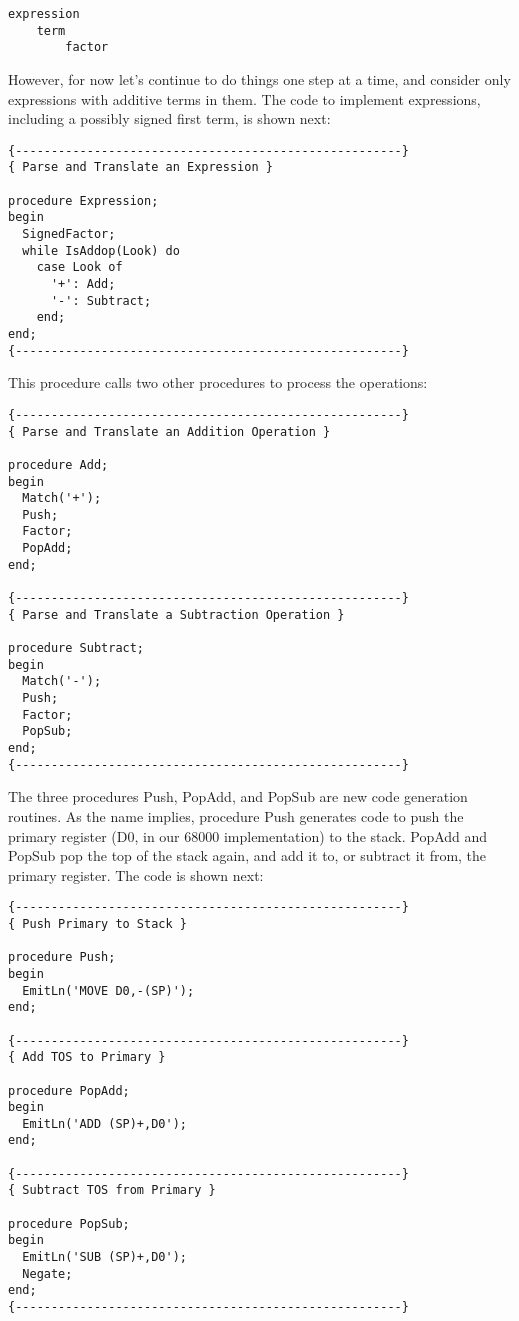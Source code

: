 \begin{verbatim}
expression
    term
        factor
\end{verbatim}

However, for now let's continue to do things one step at a time, and consider only expressions with additive terms in them. The code to implement expressions, including a possibly signed first term, is shown next:

\begin{verbatim}
{------------------------------------------------------}
{ Parse and Translate an Expression }

procedure Expression;
begin
  SignedFactor;
  while IsAddop(Look) do
    case Look of
      '+': Add;
      '-': Subtract;
    end;
end;
{------------------------------------------------------}
\end{verbatim}

This procedure calls two other procedures to process the operations:

\begin{verbatim}
{------------------------------------------------------}
{ Parse and Translate an Addition Operation }

procedure Add;
begin
  Match('+');
  Push;
  Factor;
  PopAdd;
end;

{------------------------------------------------------}
{ Parse and Translate a Subtraction Operation }

procedure Subtract;
begin
  Match('-');
  Push;
  Factor;
  PopSub;
end;
{------------------------------------------------------}
\end{verbatim}

The three procedures Push, PopAdd, and PopSub are new code generation routines. As the name implies, procedure Push generates code to push the primary register (D0, in our 68000 implementation) to the stack. PopAdd and PopSub pop the top of the stack again, and add it to, or subtract it from, the primary register. The code is shown next:

\begin{verbatim}
{------------------------------------------------------}
{ Push Primary to Stack }

procedure Push;
begin
  EmitLn('MOVE D0,-(SP)');
end;

{------------------------------------------------------}
{ Add TOS to Primary }

procedure PopAdd;
begin
  EmitLn('ADD (SP)+,D0');
end;

{------------------------------------------------------}
{ Subtract TOS from Primary }

procedure PopSub;
begin
  EmitLn('SUB (SP)+,D0');
  Negate;
end;
{------------------------------------------------------}
\end{verbatim}

